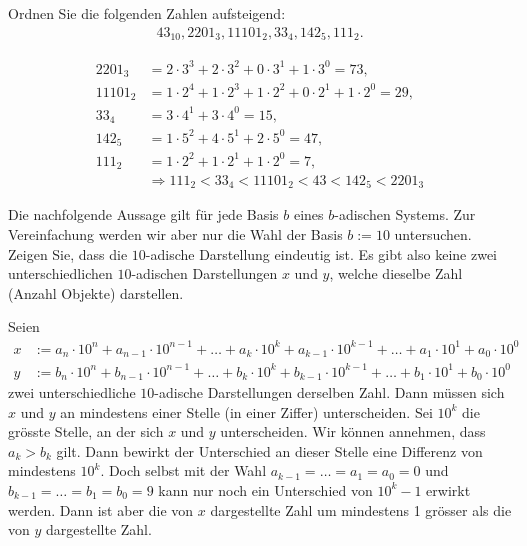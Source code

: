 \begin{myexercise}
	Ordnen Sie die folgenden Zahlen aufsteigend:
	\begin{align*}
		43_{10}, 2201_3, 11101_2, 33_4, 142_5, 111_2.
	\end{align*}
	\begin{myanswer}
		\begin{align*}
			2201_3  & = 2\cdot 3^3 + 2\cdot 3^2 + 0\cdot 3^1 + 1\cdot 3^0 = 73,              \\
			11101_2 & = 1\cdot 2^4 + 1\cdot 2^3 + 1\cdot 2^2 + 0\cdot 2^1 + 1\cdot 2^0 = 29, \\
			33_4    & = 3\cdot 4^1 + 3\cdot 4^0 = 15,                                        \\
			142_5   & = 1\cdot 5^2 + 4\cdot 5^1 + 2\cdot 5^0 = 47,                           \\
			111_2   & = 1\cdot 2^2 + 1\cdot 2^1 + 1\cdot 2^0 = 7,                            \\
			        & \Rightarrow 111_2 < 33_4 < 11101_2 < 43 < 142_5 < 2201_3
		\end{align*}
	\end{myanswer}
\end{myexercise}

\begin{mychallenge}
	Die nachfolgende Aussage gilt für jede Basis $b$ eines $b$-adischen Systems. Zur Vereinfachung werden wir aber nur die Wahl der Basis $b := 10$ untersuchen.
	Zeigen Sie, dass die $10$-adische Darstellung eindeutig ist. Es gibt also keine zwei unterschiedlichen $10$-adischen Darstellungen $x$ und $y$, welche dieselbe Zahl (Anzahl Objekte) darstellen.
	\begin{myanswer}
		Seien
		\begin{align*}
			x & := a_n\cdot 10^n + a_{n-1}\cdot 10^{n-1} + \ldots + a_k\cdot 10^k + a_{k-1}\cdot 10^{k-1} + \ldots + a_1\cdot 10^1 + a_0\cdot 10^0 \\
			y & := b_n\cdot 10^n + b_{n-1}\cdot 10^{n-1} + \ldots + b_k\cdot 10^k + b_{k-1}\cdot 10^{k-1} + \ldots + b_1\cdot 10^1 + b_0\cdot 10^0
		\end{align*}
		zwei unterschiedliche $10$-adische Darstellungen derselben Zahl.
		Dann müssen sich $x$ und $y$ an mindestens einer Stelle (in einer Ziffer) unterscheiden.
		Sei $10^k$ die grösste Stelle, an der sich $x$ und $y$ unterscheiden. Wir können annehmen, dass $a_k > b_k$ gilt. Dann bewirkt der Unterschied an dieser Stelle
		eine Differenz von mindestens $10^k$. Doch selbst mit der Wahl $a_{k-1} = \ldots = a_1 = a_0 = 0$ und $b_{k-1} = \ldots = b_1 = b_0 = 9$ kann nur noch ein Unterschied von $10^k - 1$ erwirkt werden.
		Dann ist aber die von $x$ dargestellte Zahl um mindestens 1 grösser als die von $y$ dargestellte Zahl.
	\end{myanswer}
\end{mychallenge}

